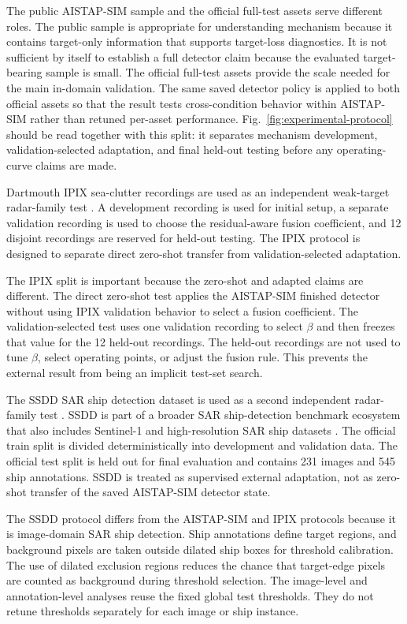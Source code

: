 \documentclass[journal]{IEEEtran}
\begin{document}
The public AISTAP-SIM sample and the official full-test assets serve different roles. The public sample is appropriate for understanding mechanism because it contains target-only information that supports target-loss diagnostics. It is not sufficient by itself to establish a full detector claim because the evaluated target-bearing sample is small. The official full-test assets provide the scale needed for the main in-domain validation. The same saved detector policy is applied to both official assets so that the result tests cross-condition behavior within AISTAP-SIM rather than retuned per-asset performance. Fig.~\ref{fig:experimental-protocol} should be read together with this split: it separates mechanism development, validation-selected adaptation, and final held-out testing before any operating-curve claims are made.

Dartmouth IPIX sea-clutter recordings are used as an independent weak-target radar-family test \cite{haykin2002seaclutter,dewind2010database}. A development recording is used for initial setup, a separate validation recording is used to choose the residual-aware fusion coefficient, and 12 disjoint recordings are reserved for held-out testing. The IPIX protocol is designed to separate direct zero-shot transfer from validation-selected adaptation.

The IPIX split is important because the zero-shot and adapted claims are different. The direct zero-shot test applies the AISTAP-SIM finished detector without using IPIX validation behavior to select a fusion coefficient. The validation-selected test uses one validation recording to select $\beta$ and then freezes that value for the 12 held-out recordings. The held-out recordings are not used to tune $\beta$, select operating points, or adjust the fusion rule. This prevents the external result from being an implicit test-set search.

The SSDD SAR ship detection dataset is used as a second independent radar-family test \cite{wang2019ssdd,zhang2021ssdd}. SSDD is part of a broader SAR ship-detection benchmark ecosystem that also includes Sentinel-1 and high-resolution SAR ship datasets \cite{huang2018opensarship,wei2020hrsid}. The official train split is divided deterministically into development and validation data. The official test split is held out for final evaluation and contains 231 images and 545 ship annotations. SSDD is treated as supervised external adaptation, not as zero-shot transfer of the saved AISTAP-SIM detector state.

The SSDD protocol differs from the AISTAP-SIM and IPIX protocols because it is image-domain SAR ship detection. Ship annotations define target regions, and background pixels are taken outside dilated ship boxes for threshold calibration. The use of dilated exclusion regions reduces the chance that target-edge pixels are counted as background during threshold selection. The image-level and annotation-level analyses reuse the fixed global test thresholds. They do not retune thresholds separately for each image or ship instance.
\end{document}

